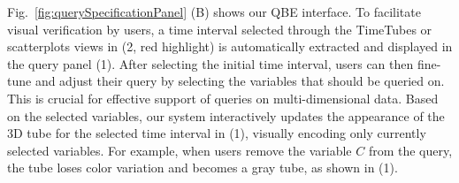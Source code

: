 Fig.~\ref{fig:querySpecificationPanel} (B) shows our QBE interface.
To facilitate visual verification by users, a time interval selected through the TimeTubes or scatterplots views in (2, red highlight) is automatically extracted and displayed in the query panel (1).
After selecting the initial time interval, users can then fine-tune and adjust their query by selecting the variables that should be queried on. 
This is crucial for effective support of queries on multi-dimensional data.
Based on the selected variables, 
our system interactively updates the appearance of the 3D tube for the selected time interval in (1), visually encoding only currently selected variables.
For example, when users remove the variable $C$ from the query, the tube loses color variation and becomes a gray tube, as shown in (1).
